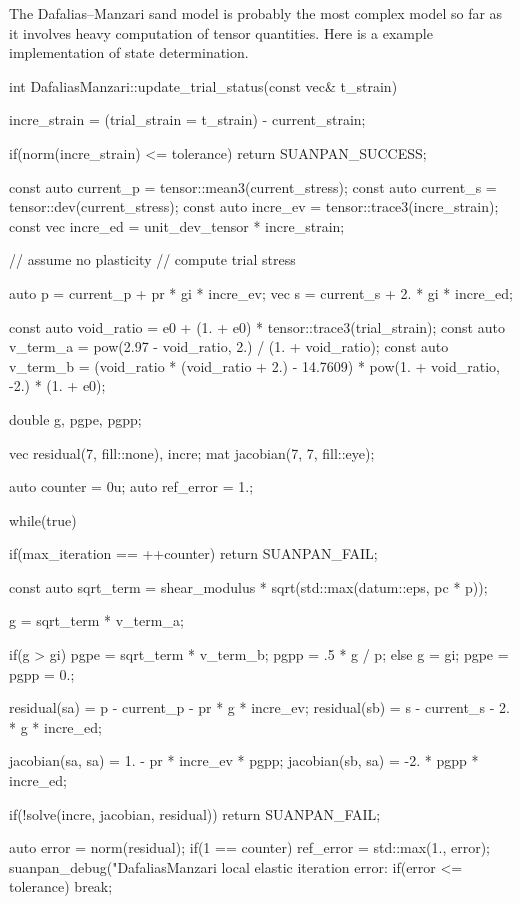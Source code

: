 The Dafalias--Manzari sand model is probably the most complex model so far as it involves heavy computation of tensor quantities. Here is a example implementation of state determination.
\begin{cppcode}
int DafaliasManzari::update_trial_status(const vec& t_strain) {
    incre_strain = (trial_strain = t_strain) - current_strain;

    if(norm(incre_strain) <= tolerance) return SUANPAN_SUCCESS;

    const auto current_p = tensor::mean3(current_stress);
    const auto current_s = tensor::dev(current_stress);
    const auto incre_ev = tensor::trace3(incre_strain);
    const vec incre_ed = unit_dev_tensor * incre_strain;

    // assume no plasticity
    // compute trial stress

    auto p = current_p + pr * gi * incre_ev;
    vec s = current_s + 2. * gi * incre_ed;

    const auto void_ratio = e0 + (1. + e0) * tensor::trace3(trial_strain);
    const auto v_term_a = pow(2.97 - void_ratio, 2.) / (1. + void_ratio);
    const auto v_term_b = (void_ratio * (void_ratio + 2.) - 14.7609) * pow(1. + void_ratio, -2.) * (1. + e0);

    double g, pgpe, pgpp;

    vec residual(7, fill::none), incre;
    mat jacobian(7, 7, fill::eye);

    auto counter = 0u;
    auto ref_error = 1.;

    while(true) {
        if(max_iteration == ++counter) return SUANPAN_FAIL;

        const auto sqrt_term = shear_modulus * sqrt(std::max(datum::eps, pc * p));

        g = sqrt_term * v_term_a;

        if(g > gi) {
            pgpe = sqrt_term * v_term_b;
            pgpp = .5 * g / p;
        }
        else {
            g = gi;
            pgpe = pgpp = 0.;
        }

        residual(sa) = p - current_p - pr * g * incre_ev;
        residual(sb) = s - current_s - 2. * g * incre_ed;

        jacobian(sa, sa) = 1. - pr * incre_ev * pgpp;
        jacobian(sb, sa) = -2. * pgpp * incre_ed;

        if(!solve(incre, jacobian, residual)) return SUANPAN_FAIL;

        auto error = norm(residual);
        if(1 == counter) ref_error = std::max(1., error);
        suanpan_debug("DafaliasManzari local elastic iteration error: %
        if(error <= tolerance) break;

}}
\end{cppcode}
